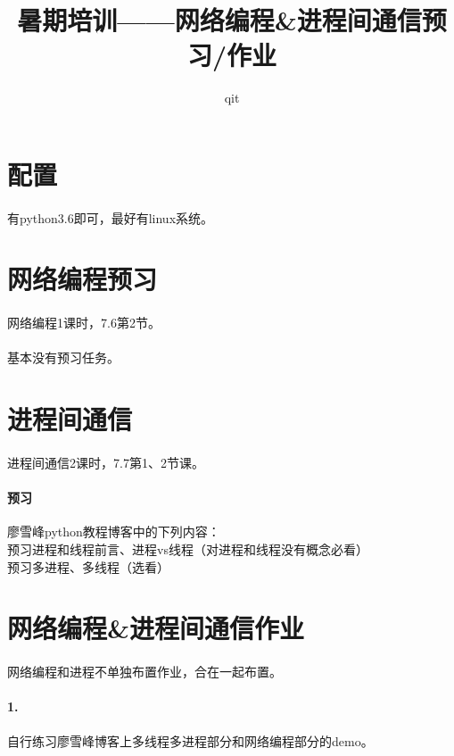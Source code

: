 \documentclass[12pt]{article}
\author{qit}
\title{暑期培训——网络编程\&进程间通信预习/作业}
\begin{document}
\begin{CJK}{UTF8}{gbsn}
\maketitle
\section{配置}
\paragraph{}有python3.6即可，最好有linux系统。

\section{网络编程预习}
\paragraph{}网络编程1课时，7.6第2节。
\paragraph{}基本没有预习任务。

\section{进程间通信}
\paragraph{}进程间通信2课时，7.7第1、2节课。
\paragraph{预习}廖雪峰python教程博客中的下列内容：
\\预习进程和线程前言、进程vs线程（对进程和线程没有概念必看）
\\预习多进程、多线程（选看）

\section{网络编程\&进程间通信作业}
\paragraph{}网络编程和进程不单独布置作业，合在一起布置。
\paragraph{1.}自行练习廖雪峰博客上多线程多进程部分和网络编程部分的demo。

\end{CJK}
\end{document}
